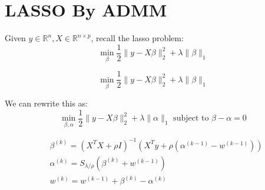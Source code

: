 \section{LASSO By ADMM}

Given $y \in \mathbb{R}^{n}, X \in \mathbb{R}^{n \times p}$, recall the lasso problem:
$$
\min _{\beta} \frac{1}{2}\|y-X \beta\|_{2}^{2}+\lambda\|\beta\|_{1}
$$


$$
\min _{\beta} \frac{1}{2}\|y-X \beta\|_{2}^{2}+\lambda\|\beta\|_{1}
$$

We can rewrite this as:
$$
\min _{\beta, \alpha} \frac{1}{2}\|y-X \beta\|_{2}^{2}+\lambda\|\alpha\|_{1} \text { subject to } \beta-\alpha=0
$$

\begin{align}
    &\beta^{(k)}=\left(X^{T} X+\rho I\right)^{-1}\left(X^{T} y+\rho\left(\alpha^{(k-1)}-w^{(k-1)}\right)\right) \\
    &\alpha^{(k)}=S_{\lambda / \rho}\left(\beta^{(k)}+w^{(k-1)}\right) \\
    &w^{(k)}=w^{(k-1)}+\beta^{(k)}-\alpha^{(k)}
\end{align}


